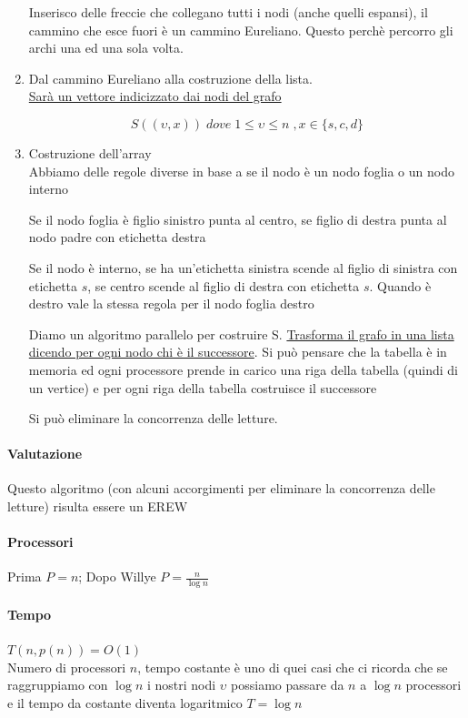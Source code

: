 \begin{enumerate}
    Inserisco delle freccie che collegano tutti i nodi (anche quelli espansi), il cammino che esce fuori è un cammino Eureliano. Questo perchè percorro gli archi una ed una sola volta.

    \item Dal cammino Eureliano alla costruzione della lista.\\
    \uline{Sarà un vettore indicizzato dai nodi del grafo}

    $$S( (\upsilon, x) )\; dove\; 1\leq \upsilon \leq n \; , x \in \{s,c,d\} $$

    \item Costruzione dell'array\\
    Abbiamo delle regole diverse in base a se il nodo è un nodo foglia o un nodo interno 

    Se il nodo foglia è figlio sinistro punta al centro, se figlio di destra punta al nodo padre con etichetta destra

    Se il nodo è interno, se ha un'etichetta sinistra scende al figlio di sinistra con etichetta $s$, se centro scende al figlio di destra con etichetta $s$. Quando è destro vale la stessa regola per il nodo foglia destro

    Diamo un algoritmo parallelo per costruire S. \uline{Trasforma il grafo in una lista dicendo per ogni nodo chi è il successore}. Si può pensare che la tabella è in memoria ed ogni processore prende in carico una riga della tabella (quindi di un vertice) e per ogni riga della tabella costruisce il successore

    Si può eliminare la concorrenza delle letture.
\end{enumerate}

\paragraph{Valutazione}
    Questo algoritmo (con alcuni accorgimenti per eliminare la concorrenza delle letture) risulta essere un EREW 

\paragraph{Processori}  Prima $P = n$; Dopo Willye $P = \frac{n}{\log n}$

\paragraph{Tempo} $T(n, p(n)) = O(1)$\\
Numero di processori $n$, tempo costante è uno di quei casi che ci ricorda che se raggruppiamo con $\log n$ i nostri nodi $\upsilon$ possiamo passare da $n$ a $\log n$ processori e il tempo da costante diventa logaritmico $T = \log n$

\newpage
